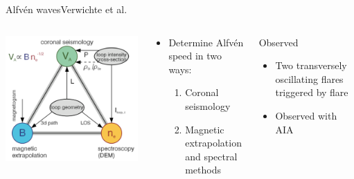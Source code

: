 \documentclass[11pt,table]{beamer}
\begin{document}
\begin{frame}{Alfv\'en waves}{Verwichte et al.}
    \begin{columns}
        \includegraphics[width=\textwidth]{tor2.png}
        \begin{block}{}
            \begin{itemize}
                \item Determine Alfv\'en speed in two ways:
                    \begin{enumerate}
                        \item Coronal seismology
                        \item Magnetic extrapolation and spectral methods
                    \end{enumerate}
            \end{itemize}
        \end{block}
        \begin{block}{Observed}
            \begin{itemize}
                \item Two transversely oscillating flares triggered by flare
                \item Observed with AIA
            \end{itemize}
        \end{block}
    \end{columns}
\end{frame}%
\end{document}
